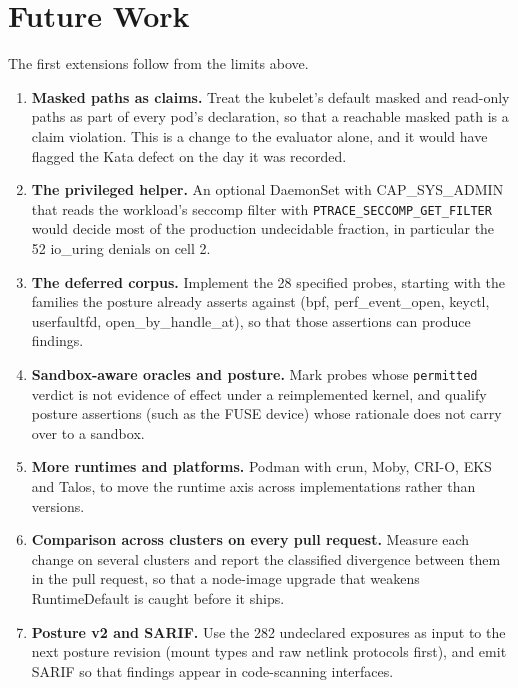 \section{Future Work}

The first extensions follow from the limits above.
\begin{enumerate}[leftmargin=*]
\item \textbf{Masked paths as claims.} Treat the kubelet's default masked and read-only paths as part of every pod's declaration, so that a reachable masked path is a claim violation. This is a change to the evaluator alone, and it would have flagged the Kata defect on the day it was recorded.
\item \textbf{The privileged helper.} An optional DaemonSet with CAP\_SYS\_ADMIN that reads the workload's seccomp filter with \texttt{PTRACE\_SECCOMP\_GET\_FILTER} would decide most of the production undecidable fraction, in particular the 52 io\_uring denials on cell 2.
\item \textbf{The deferred corpus.} Implement the 28 specified probes, starting with the families the posture already asserts against (bpf, perf\_event\_open, keyctl, userfaultfd, open\_by\_handle\_at), so that those assertions can produce findings.
\item \textbf{Sandbox-aware oracles and posture.} Mark probes whose \texttt{permitted} verdict is not evidence of effect under a reimplemented kernel, and qualify posture assertions (such as the FUSE device) whose rationale does not carry over to a sandbox.
\item \textbf{More runtimes and platforms.} Podman with crun, Moby, CRI-O, EKS and Talos, to move the runtime axis across implementations rather than versions.
\item \textbf{Comparison across clusters on every pull request.} Measure each change on several clusters and report the classified divergence between them in the pull request, so that a node-image upgrade that weakens RuntimeDefault is caught before it ships.
\item \textbf{Posture v2 and SARIF.} Use the 282 undeclared exposures as input to the next posture revision (mount types and raw netlink protocols first), and emit SARIF so that findings appear in code-scanning interfaces.
\end{enumerate}
